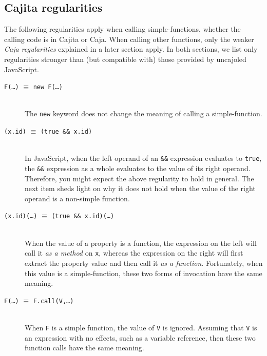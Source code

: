 \documentclass[letterpaper,twocolumn,10pt]{article}
\newcommand{\code}[1]{{\tt {#1}}}              %
\begin{document}
\subsection{Cajita regularities}

The following regularities apply when calling simple-functions, whether the 
calling code is in Cajita or Caja. When calling other functions, only the 
weaker \emph{Caja regularities} explained in a later section apply. In both 
sections, we list only regularities stronger than (but compatible with) those 
provided by uncajoled JavaScript.

\begin{description}
  \item[\code{F(\ldots)} $\equiv$ \code{new F(\ldots)}]
  
  \ \\
  The \code{new} keyword does not change the meaning of calling a 
  simple-function.
  
  \item[\code{(x.id)} $\equiv$ \code{(true \&\& x.id)}]
  
  \ \\
  In JavaScript, when the left operand of an \code{\&\&} expression evaluates 
  to \code{true}, the \code{\&\&} expression as a whole evaluates to the 
  value of its right operand. Therefore, you might expect the above 
  regularity to hold in general. The next item sheds light on why it does not 
  hold when the value of the right operand is a non-simple function.

  \item[\code{(x.id)(\ldots)} $\equiv$ \code{(true \&\& x.id)(\ldots)}]
  
  \ \\
  When the value of a property is a function, the expression on the left will 
  call it \emph{as a method} on \code{x}, whereas the expression on the right 
  will first extract the property value and then call it \emph{as a 
  function}. Fortunately, when this value is a simple-function, these two 
  forms of invocation have the same meaning.

  \item[\code{F(\ldots)} $\equiv$ \code{F.call(V,\ldots)}]
  
  \ \\
  When \code{F} is a simple function, the value of \code{V} is ignored. 
  Assuming that \code{V} is an expression with no effects, such as a variable 
  reference, then these two function calls have the same meaning.
  

\end{description}
\end{document}
